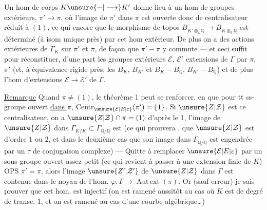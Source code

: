 Un hom de corps $K\unsure{-|\longrightarrow}K'$ donne lieu à un hom de groupes extérieurs,
 $\pi'\longrightarrow\pi$, où l'image de $\pi'$ dans $\pi$ est ouverte donc de centralisateur réduit à $(1)$, ce qui  encore que le morphisme de topos $B_{K'\otimes_k\overline{\mathbb Q}}\longrightarrow B_{K\otimes_k\overline{\mathbb Q}}$ est déterminé (à isom unique près) par cet hom extérieur. De plus on a des actions extérieures de \inserted{$\Gamma=$}$\Gamma_K$ sur $\pi'$ et $\pi$, de façon que $\pi'-\pi$ y commute --- et ceci suffit pour réconstituer, d'une part les groupes extérieurs $\mathcal E$, $\mathcal E'$ extensions  de $\Gamma$ par $\pi$, $\pi'$ (et, à équivalence rigide près, les $B_K$, $B_{K'}$ et $B_K-B_{\mathbb Q}$, $B_{K'}-B_{\mathbb Q}$) et de plus l'hom d'extensions  $\mathcal E\longrightarrow\mathcal E'$ de $\Gamma$.

\uline{Remarque} Quand $\pi\neq(1)$,  le théorème 1 peut se renforcer,  en  que pour tt ss-groupe  ouvert \uline{dans $\pi$}, $\operatorname{Centr}_{\unsure{\mathcal E|E|\varepsilon}}(\pi')=\{1\}$. Si $\unsure{Z|\mathcal Z}$ est ce centralisateur, on a $\unsure{Z|\mathcal Z}\cap\pi=(1)$ d'après le 1,  l'image de $\unsure{Z|\mathcal Z}$ dans $\Gamma_{\bar K/K}\subset\Gamma_{\overline{\mathbb Q}/\mathbb Q}$ est  (ce qui prouvera  , que $\unsure{Z|\mathcal Z}$ est d'ordre $1$ ou $2$, et dans le deuxième cas que son image dans $\Gamma_{\overline{\mathbb Q}/\mathbb Q}$ est  engendrée par un $\tau$ de conjugaison complexe) --- Quitte à remplacer $\unsure{\mathcal E|E|\varepsilon}$ par un sous-groupe ouvert assez petit (ce qui revient à passer à une extension finie de $K$) OPS $\pi'=\pi$, alors l'image $\unsure{Z'|\mathcal Z'}$ de $\unsure{Z|\mathcal Z}$ dans $\Gamma$ est contenue dans le noyau de l'hom. $\varphi:\Gamma\longrightarrow\operatorname{Aut\,ext}(\pi)$. Or (sauf erreur) je sais prouver que cet hom. est injectif (on est ramené aussitôt au cas où $K$ est de degré de transc. $1$, et on est ramené au cas  d'une courbe algébrique\ldots)

